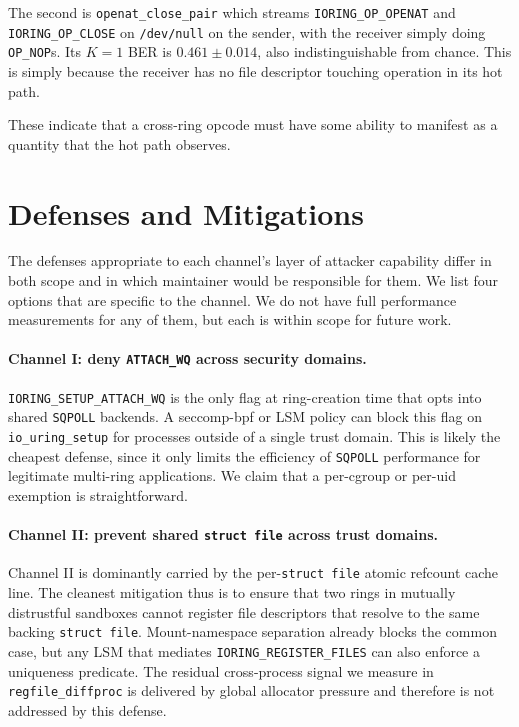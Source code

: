 \documentclass[letterpaper,twocolumn,10pt]{article}
\newcommand{\code}[1]{\texttt{#1}}
\begin{document}
The second is \code{openat\_close\_pair} which streams \code{IORING\_OP\_OPENAT} and \code{IORING\_OP\_CLOSE} on \code{/dev/null} on the sender, with the receiver simply doing \code{OP\_NOP}s. Its $K = 1$ BER is $0.461 \pm 0.014$, also indistinguishable from chance. This is simply because the receiver has no file descriptor touching operation in its hot path. 

These indicate that a cross-ring opcode must have some ability to manifest as a quantity that the hot path observes.

\section{Defenses and Mitigations}
The defenses appropriate to each channel's layer of attacker capability differ in both scope and in which maintainer would be responsible for them. We list four options that are specific to the channel. We do not have full performance measurements for any of them, but each is within scope for future work.

\paragraph{Channel I: deny \code{ATTACH\_WQ} across security domains.} \code{IORING\_SETUP\_ATTACH\_WQ} is the only flag at ring-creation time that opts into shared \code{SQPOLL} backends. A seccomp-bpf or LSM policy can block this flag on \code{io\_uring\_setup} for processes outside of a single trust domain. This is likely the cheapest defense, since it only limits the efficiency of \code{SQPOLL} performance for legitimate multi-ring applications. We claim that a per-cgroup or per-uid exemption is straightforward.

\paragraph{Channel II: prevent shared \code{struct file} across trust domains.} Channel II is dominantly carried by the per-\code{struct file} atomic refcount cache line. The cleanest mitigation thus is to ensure that two rings in mutually distrustful sandboxes cannot register file descriptors that resolve to the same backing \code{struct file}. Mount-namespace separation already blocks the common case, but any LSM that mediates \code{IORING\_REGISTER\_FILES} can also enforce a uniqueness predicate. The residual cross-process signal we measure in \code{regfile\_diffproc} is delivered by global allocator pressure and therefore is not addressed by this defense.
\end{document}
